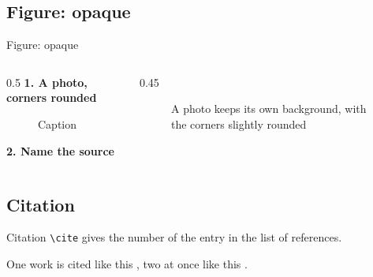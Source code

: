 \documentclass[aspectratio=1610,xcolor=dvipsnames]{beamer}
\begin{document}
\subsection{Figure: opaque}
\begin{frame}[fragile]{Figure: opaque}
\begin{columns}[T,onlytextwidth]
\begin{column}{0.5\textwidth}
\textbf{1. A photo, corners rounded}\par\smallskip
\begin{codeonly}
\begin{figure}
  \caption{Caption}
\end{figure}
\end{codeonly}
\smallskip
\textbf{2. Name the source}\par\smallskip
\begin{codeonly}
\end{codeonly}
\end{column}
\begin{column}{0.45\textwidth}
\begin{figure}
    \caption{A photo keeps its own background, with the corners slightly rounded}
\end{figure}
\end{column}
\end{columns}
\end{frame}

\subsection{Citation}
\begin{frame}[fragile]{Citation}
    \verb|\cite| gives the number of the entry in the list of references.

    One work is cited like this \cite{p1}, two at once like this \cite{p1,p2}.
\end{frame}
\end{document}
